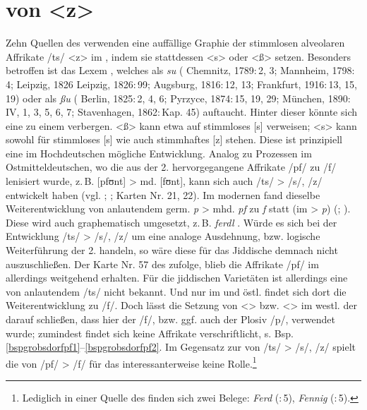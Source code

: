 \section{ von <z>}\label{sz}
Zehn Quellen des  verwenden eine auffällige Graphie der stimmlosen alveolaren Affrikate /ts/ <z> im , indem sie stattdessen <s> oder <ß> setzen. Besonders betroffen ist das Lexem , welches als \textit{su} ( Chemnitz, 1789:\,2, 3;  Mannheim, 1798:\,4;  Leipzig, 1826 Leipzig, 1826:\,99;  Augsburg, 1816:\,12, 13;  Frankfurt, 1916:\,13, 15, 19) oder als \textit{ßu} ( Berlin, 1825:\,2, 4, 6;  Pyrzyce, 1874:\,15, 19, 29;  München, 1890:\, IV, 1, 3, 5, 6, 7;  Stavenhagen, 1862:\,Kap. 45) auftaucht. Hinter dieser  könnte sich eine  zu einem  verbergen. <ß> kann etwa auf stimmloses [s] verweisen; <s> kann sowohl für stimmloses [s] wie auch stimmhaftes [z] stehen. Diese  ist prinzipiell eine im Hochdeutschen mögliche Entwicklung. Analog zu Prozessen im Ostmitteldeutschen, wo die aus der 2.  hervorgegangene Affrikate /pf/ zu /f/ lenisiert wurde, z.\,B. [pfʊnt] > md. [fʊnt], kann sich auch /ts/ > /s/, /z/ entwickelt haben (vgl. \cite[273, 282]{Schirmunski1962}; \cite[64f]{Koenig1978};  Karten Nr. 21, 22). Im modernen  fand dieselbe Weiterentwicklung von anlautendem germ. \textit{p} > mhd. \textit{pf} zu \textit{f} statt (im  > \textit{p}) (\cite[189]{Kleine2008}; \cite[323–327]{Bin-Nun1973}). Diese wird auch graphematisch umgesetzt, z.\,B.  \textit{ferdl} . Würde es sich bei der Entwicklung /ts/ > /s/, /z/ um eine analoge Ausdehnung, bzw. logische Weiterführung der 2.  handeln, so wäre diese für das Jiddische demnach nicht auszuschließen. Der Karte Nr. 57 des  zufolge, blieb die Affrikate /pf/ im  allerdings weitgehend erhalten.  Für die jiddischen Varietäten ist allerdings eine  von anlautendem /ts/ nicht bekannt. Und nur im  und östl.  findet sich dort die Weiterentwicklung zu /f/. Doch lässt die Setzung von <> bzw. <> im westl.  der  darauf schließen, dass hier der  /f/, bzw. ggf. auch der Plosiv /p/, verwendet wurde; zumindest findet sich keine Affrikate verschriftlicht, s. Bsp. \ref{bspgrobsdorfpf1}--\ref{bspgrobsdorfpf2}. Im Gegensatz zur  von /ts/ > /s/, /z/ spielt die von /pf/ > /f/ für das  interessanterweise keine Rolle.\footnote{Lediglich in einer Quelle des  finden sich zwei Belege: \textit{Ferd}  (:\,5), \textit{Fennig}  (:\,5).} \\%

